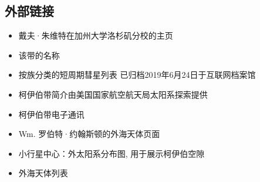 \subsection{外部链接}
\begin{itemize}
\item 戴夫·朱维特在加州大学洛杉矶分校的主页
\item 该带的名称
\item 按族分类的短周期彗星列表 已归档2019年6月24日于互联网档案馆
\item 柯伊伯带简介由美国国家航空航天局太阳系探索提供
\item 柯伊伯带电子通讯
\item Wm. 罗伯特·约翰斯顿的外海天体页面
\item 小行星中心：外太阳系分布图, 用于展示柯伊伯空隙
\item 外海天体列表
\end{itemize}